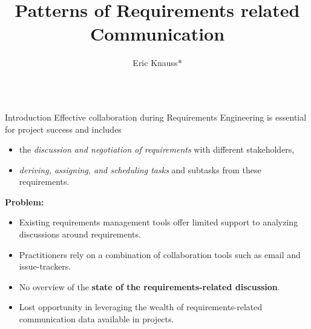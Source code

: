 \documentclass[final]{beamer} %
\title[Requirements Patterns]{Patterns of Requirements related Communication}
\author[Knauss]{Eric Knauss*}
\institute[University of Victoria]{University of Victoria, Canada\\ \vspace{2ex} {\footnotesize *) In collaboration with Daniela Damian and Jane Cleland-Huang}}
\newcommand{\marker}[1]{\textbf{\color{knaccentcolor1} #1}}
\begin{document}
  
\begin{frame}{} 
\vspace{-0.4cm}
\begin{columns}[t]

  \begin{column}{.45\linewidth}
  
  
    \begin{block}{Introduction}
Effective collaboration during Requirements Engineering is essential for project success and %
includes 
\begin{itemize}
\item the \emph{discussion and negotiation of requirements} with different stakeholders,
\item \emph{deriving, assigning, and scheduling tasks} and subtasks from these requirements. 
\end{itemize}

\textbf{Problem:} 
\begin{itemize}
\item Existing requirements management tools offer limited support to analyzing discussions around requirements.
\item Practitioners rely on a combination of collaboration tools such as email and issue-trackers. 
\item No overview of the  \marker{state of the requirements-related discussion}.
\item Lost opportunity in leveraging the wealth of requirements-related communication data available in projects.
\end{itemize}
    \end{block}
    
    
     
    

\end{column}
\end{columns}
\end{frame}
\end{document}
